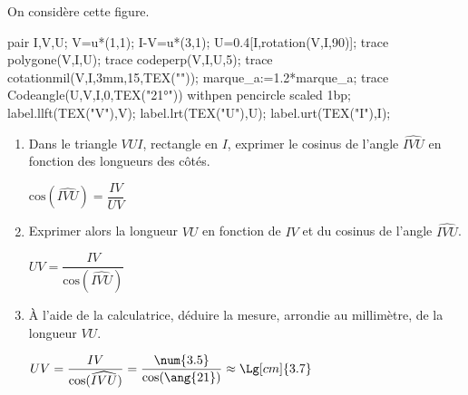 \begin{corrige}
    On considère cette figure.

    \begin{Geometrie}
        pair I,V,U;
        V=u*(1,1);
        I-V=u*(3,1);
        U=0.4[I,rotation(V,I,90)];
        trace polygone(V,I,U);
        trace codeperp(V,I,U,5);
        trace cotationmil(V,I,3mm,15,TEX(""));
        marque_a:=1.2*marque_a;                
        trace Codeangle(U,V,I,0,TEX("\ang{21}")) withpen pencircle scaled 1bp;
        label.llft(TEX("V"),V);
        label.lrt(TEX("U"),U);
        label.urt(TEX("I"),I);
    \end{Geometrie}

    \begin{enumerate}
        \item Dans le triangle $VUI$, rectangle en $I$, exprimer le cosinus de l'angle $\widehat{IVU}$ en fonction des longueurs des côtés.
        
        {\color{red} $\text{cos}(\widehat{IVU})=\dfrac{IV}{UV}$}
        \item Exprimer alors la longueur $VU$ en fonction de $IV$ et du cosinus de l'angle $\widehat{IVU}$.
        
        {\color{red} $UV=\dfrac{IV}{\text{cos}(\widehat{IVU})}$}
        \item À l'aide de la calculatrice, déduire la mesure, arrondie au millimètre, de la longueur $VU$.
        
        {\color{red} $UV=\dfrac{IV}{\text{cos}(\widehat{IVU})}=\dfrac{\num{3.5}}{\text{cos}(\ang{21})}\approx\Lg[cm]{3.7}$}
    \end{enumerate}
\end{corrige}

